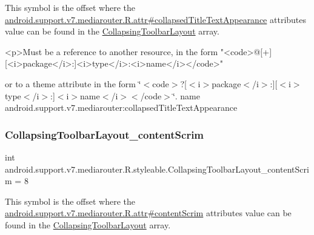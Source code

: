 This symbol is the offset where the \hyperlink{classandroid_1_1support_1_1v7_1_1mediarouter_1_1R_1_1attr_a2993405c76ed4757e250557ecbdc4943}{android.\+support.\+v7.\+mediarouter.\+R.\+attr\#collapsed\+Title\+Text\+Appearance} attribute\textquotesingle{}s value can be found in the \hyperlink{classandroid_1_1support_1_1v7_1_1mediarouter_1_1R_1_1styleable_aae2cb4975e9b9a19d129888f497cc386}{Collapsing\+Toolbar\+Layout} array.

\begin{DoxyVerb}      <p>Must be a reference to another resource, in the form "<code>@[+][<i>package</i>:]<i>type</i>:<i>name</i></code>"
\end{DoxyVerb}
 or to a theme attribute in the form \char`\"{}$<$code$>$?\mbox{[}$<$i$>$package$<$/i$>$\+:\mbox{]}\mbox{[}$<$i$>$type$<$/i$>$\+:\mbox{]}$<$i$>$name$<$/i$>$$<$/code$>$\char`\"{}.  name android.\+support.\+v7.\+mediarouter\+:collapsed\+Title\+Text\+Appearance \mbox{\label{classandroid_1_1support_1_1v7_1_1mediarouter_1_1R_1_1styleable_a733f927a6b32c7e392024dee4d4567eb}} 
\subsubsection{\texorpdfstring{Collapsing\+Toolbar\+Layout\+\_\+content\+Scrim}{CollapsingToolbarLayout\_contentScrim}}
{\footnotesize\ttfamily int android.\+support.\+v7.\+mediarouter.\+R.\+styleable.\+Collapsing\+Toolbar\+Layout\+\_\+content\+Scrim = 8\hspace{0.3cm}{\ttfamily [static]}}

This symbol is the offset where the \hyperlink{classandroid_1_1support_1_1v7_1_1mediarouter_1_1R_1_1attr_a805598343f4fecc958998b8eb6d74a18}{android.\+support.\+v7.\+mediarouter.\+R.\+attr\#content\+Scrim} attribute\textquotesingle{}s value can be found in the \hyperlink{classandroid_1_1support_1_1v7_1_1mediarouter_1_1R_1_1styleable_aae2cb4975e9b9a19d129888f497cc386}{Collapsing\+Toolbar\+Layout} array.

